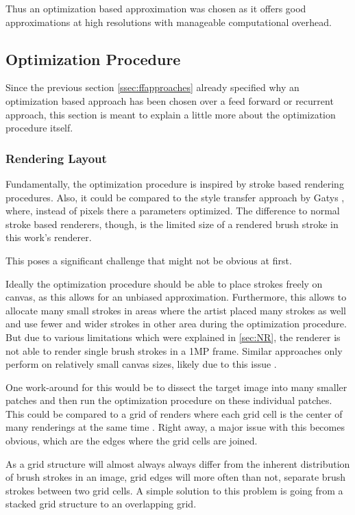 Thus an optimization based approximation was chosen as it offers good approximations
at high resolutions with manageable computational overhead.

\subsection{Optimization Procedure}
Since the previous section \ref{ssec:ffapproaches} already specified why an optimization
based approach has been chosen over a feed forward or recurrent approach, this section
is meant to explain a little more about the optimization procedure itself.


\subsubsection{Rendering Layout}
Fundamentally, the optimization procedure is inspired by stroke based rendering procedures.
Also, it could be compared to the style transfer approach by Gatys \etal \cite{gatys}, where, 
instead of pixels there a parameters optimized.
The difference to normal stroke based renderers, though, is the limited size of a
rendered brush stroke in this work's renderer.

This poses a significant challenge that might not be obvious at first.

Ideally the optimization procedure should be able to place strokes freely on canvas,
as this allows for an unbiased approximation.
Furthermore, this allows to allocate many small strokes in areas where the artist
placed many strokes as well and use fewer and wider strokes in other area during
the optimization procedure.
But due to various limitations which were explained in \ref{sec:NR}, the renderer
is not able to render single brush strokes in a 1MP frame.
Similar approaches only perform on relatively small canvas sizes, likely due to this
issue .

One work-around for this would be to dissect the target image into many smaller
patches and then run the optimization procedure on these individual patches.
This could be compared to a grid of renders where each grid cell is the center of
many renderings at the same time .
Right away, a major issue with this becomes obvious, which are the edges where the
grid cells are joined.

As a grid structure will almost always always differ from the inherent distribution
of brush strokes in an image, grid edges will more often than not, separate brush
strokes between two grid cells.
A simple solution to this problem is going from a stacked grid structure to an overlapping
grid. 

